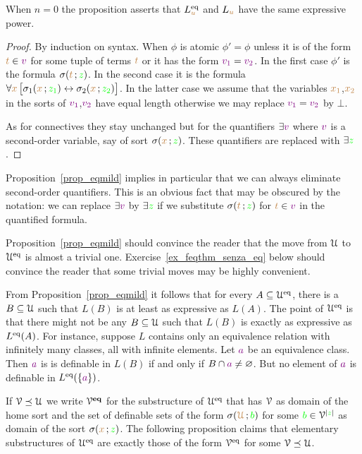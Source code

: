 \documentclass[creche.tex]{subfiles}
\begin{document}
When $n=0$ the proposition asserts that $L_{{\color{brown} u}}^{{\rm eq}}$ and $L_{{\color{brown} u}}$ have the same expressive power.

\begin{proof}
By induction on syntax. When $\phi$ is atomic $\phi'=\phi$ unless it is of the form ${\color{brown} t}\in {\color{violet}v}$ for some tuple of terms ${\color{brown} t}$ or it has the form ${\color{violet} v_1}={\color{violet} v_2}$. In the first case $\phi'$ is the formula $\sigma({\color{brown} t}\,;{\color{green} z})$. In the second case it is the formula $\forall {\color{brown}x}\,\big[\sigma_1({\color{brown} x}\,;{\color{green} z_1}) \leftrightarrow\sigma_2({\color{brown} x}\,;{\color{green} z_2})\big]$. In the latter case we assume that the variables ${\color{brown} x_1}$,${\color{brown} x_2}$ in the sorts of  ${\color{violet} v_1}$,${\color{violet} v_2}$ have equal length otherwise we may replace ${\color{violet} v_1}={\color{violet} v_2}$ by $\bot$.

As for connectives they stay unchanged but for the quantifiers $\exists {\color{violet}v}$ where ${\color{violet} v}$ is a second-order variable, say of sort $\sigma({\color{brown} x}\,;{\color{green} z})$. These quantifiers are replaced with $\exists{\color{green}z}$.
\end{proof}

Proposition~\ref{prop_eqmild} implies in particular that we can always eliminate second-order quantifiers. This is an obvious fact that may be obscured by the notation: we can replace $\exists {\color{violet}v}$ by $\exists {\color{green}z}$ if we substitute  $\sigma({\color{brown} t}\,;{\color{green} z})$ for ${\color{brown} t}\in {\color{violet}v}$ in the quantified formula.

Proposition~\ref{prop_eqmild} should convince the reader that the move from $\EuScript U$ to $\EuScript U^{{\rm eq}}$ is almost a trivial one. Exercise~\ref{ex_feqthm_senza_eq} below should convince the reader that some trivial moves may be highly convenient.


\begin{remark}\label{rem_eqmild}
From Proposition~\ref{prop_eqmild} it follows that for every $A\subseteq\EuScript U^{{\rm eq}}$, there is a $B\subseteq\EuScript U$ such that $L(B)$ is at least as expressive as $L(A)$. The point of $\EuScript U^{{\rm eq}}$ is that there might not be any $B\subseteq\EuScript U$ such that $L(B)$ is exactly as expressive as $L^{{\rm eq}}(A)$. For instance, suppose $L$ contains only an equivalence relation with infinitely many classes, all with infinite elements. Let ${\color{violet} a}$ be an equivalence class. Then ${\color{violet} a}$ is is definable in $L(B)$ if and only if $B\cap {\color{violet}a}\neq\varnothing$. But no element of ${\color{violet} a}$ is definable in $L^{{\rm eq}}(\{{\color{violet} a}\})$.\QED
\end{remark}

If $\EuScript V\preceq\EuScript U$ we write \emph{$\EuScript V^{\textbf{eq}}$\/} for the substructure of $\EuScript U^{{\rm eq}}$ that has $\EuScript V$ as domain of the home sort and  the set of definable sets of the form $\sigma({\color{brown}\EuScript U}\,;{\color{green} b})$ for some ${\color{green} b}\in \EuScript V^{|{\color{green} z}|}$ as domain of the sort $\sigma({\color{brown} x}\,;{\color{green} z})$. 
The following proposition claims that elementary substructures of $\EuScript U^{{\rm eq}}$ are exactly those of the form $\EuScript V^{{\rm eq}}$ for some $\EuScript V\preceq\EuScript U$. 
\end{document}
